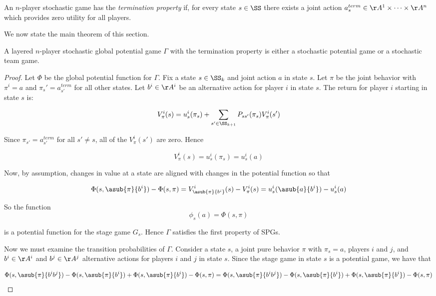 \begin{mydef}
An $n$-player stochastic game has the {\em termination property} if, for every state $s \in \SS$ there exists a joint action $a^{term}_s \in \AA^1 \times \cdots \times \AA^n$ which provides zero utility for all players.
\end{mydef}

We now state the main theorem of this section.

\begin{thm}
A layered $n$-player stochastic global potential game $\Gamma$ with the termination property is either a stochastic potential game or a stochastic team game.
\end{thm}

\begin{proof}
Let $\Phi$ be the global potential function for $\Gamma$. Fix a state $s \in \SS_k$ and joint action $a$ in state $s$. Let $\pi$ be the joint behavior with $\pi^i = a$ and $\pi_s' = a^{term}_{s'}$ for all other states. Let $b^i \in \AA^i$ be an alternative action for player $i$ in state $s$. The return for player $i$ starting in state $s$ is:

$$
V^i_{\pi}(s) = u^i_s(\pi_s) + \sum_{s' \in \SS_{k+1}} P_{ss'}(\pi_s) V^i_{\pi}(s')
$$

Since $\pi_{s'} = a^{term}_{s'}$ for all $s' \neq s$, all of the $V^i_{\pi}(s')$ are zero. Hence

$$
V^i_{\pi}(s) = u^i_s(\pi_s) = u^i_s(a)
$$

Now, by assumption, changes in value at a state are aligned with changes in the potential function so that

$$
\Phi(s,\asub{\pi}{b^i}) - \Phi(s,\pi) = V^i_{\asub{\pi}{b^i}}(s) - V^i_{\pi}(s) = u^i_s(\asub{a}{b^i}) - u^i_s(a)
$$

So the function
$$
\phi_s(a) = \Phi(s,\pi)
$$

is a potential function for the stage game $G_s$. Hence $\Gamma$ satisfies the first property of SPGs.

Now we must examine the transition probabilities of $\Gamma$. Consider a state $s$, a joint pure behavior $\pi$ with $\pi_s = a$, players $i$ and $j$, and $b^i \in \AA^i$ and $b^j \in \AA^j$ alternative actions for players $i$ and $j$ in state $s$. Since the stage game in state $s$ is a potential game, we have that

$$
\Phi(s,\asub{\pi}{b^ib^j}) - \Phi(s,\asub{\pi}{b^i}) + \Phi(s,\asub{\pi}{b^i}) - \Phi(s,\pi) \\
= \\
\Phi(s,\asub{\pi}{b^ib^j}) - \Phi(s,\asub{\pi}{b^i}) +\Phi(s,\asub{\pi}{b^i}) - \Phi(s,\pi)
$$


\end{proof}
